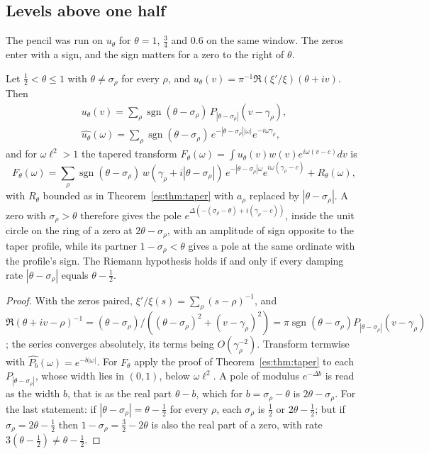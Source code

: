 \subsection{Levels above one half}

The pencil was run on $u_\theta$ for $\theta=1$, $\tfrac34$ and $0.6$ on the same window. The zeros enter with a sign, and the sign matters for a zero to the right of $\theta$.

\begin{proposition}\label{es:prop:level}
Let $\tfrac12<\theta\le1$ with $\theta\ne\sigma_\rho$ for every $\rho$, and $u_\theta(v)=\pi^{-1}\Re(\xi'/\xi)(\theta+iv)$. Then
\[
\begin{gathered}u_\theta(v)=\sum_\rho\operatorname{sgn}(\theta-\sigma_\rho)\,P_{|\theta-\sigma_\rho|}(v-\gamma_\rho),\\ \widehat{u_\theta}(\omega)=\sum_\rho\operatorname{sgn}(\theta-\sigma_\rho)\,e^{-|\theta-\sigma_\rho||\omega|}e^{-i\omega\gamma_\rho},\end{gathered}
\]
and for $\omega\ell^2>1$ the tapered transform $F_\theta(\omega)=\int u_\theta(v)w(v)e^{i\omega(v-c)}dv$ is
\[
F_\theta(\omega)=\sum_\rho\operatorname{sgn}(\theta-\sigma_\rho)\,w(\gamma_\rho+i|\theta-\sigma_\rho|)\,e^{-|\theta-\sigma_\rho|\omega}e^{i\omega(\gamma_\rho-c)}+R_\theta(\omega),
\]
with $R_\theta$ bounded as in Theorem~\ref{es:thm:taper} with $a_\rho$ replaced by $|\theta-\sigma_\rho|$. A zero with $\sigma_\rho>\theta$ therefore gives the pole $e^{\Delta(-(\sigma_\rho-\theta)+i(\gamma_\rho-c))}$, inside the unit circle on the ring of a zero at $2\theta-\sigma_\rho$, with an amplitude of sign opposite to the taper profile, while its partner $1-\sigma_\rho<\theta$ gives a pole at the same ordinate with the profile's sign. The Riemann hypothesis holds if and only if every damping rate $|\theta-\sigma_\rho|$ equals $\theta-\tfrac12$.
\end{proposition}

\begin{proof}
With the zeros paired, $\xi'/\xi(s)=\sum_\rho(s-\rho)^{-1}$, and $\Re(\theta+iv-\rho)^{-1}=(\theta-\sigma_\rho)/((\theta-\sigma_\rho)^2+(v-\gamma_\rho)^2)=\pi\operatorname{sgn}(\theta-\sigma_\rho)P_{|\theta-\sigma_\rho|}(v-\gamma_\rho)$; the series converges absolutely, its terms being $O(\gamma_\rho^{-2})$. Transform termwise with $\widehat{P_b}(\omega)=e^{-b|\omega|}$. For $F_\theta$ apply the proof of Theorem~\ref{es:thm:taper} to each $P_{|\theta-\sigma_\rho|}$, whose width lies in $(0,1)$, below $\omega\ell^2$. A pole of modulus $e^{-\Delta b}$ is read as the width $b$, that is as the real part $\theta-b$, which for $b=\sigma_\rho-\theta$ is $2\theta-\sigma_\rho$. For the last statement: if $|\theta-\sigma_\rho|=\theta-\tfrac12$ for every $\rho$, each $\sigma_\rho$ is $\tfrac12$ or $2\theta-\tfrac12$; but if $\sigma_\rho=2\theta-\tfrac12$ then $1-\sigma_\rho=\tfrac32-2\theta$ is also the real part of a zero, with rate $3(\theta-\tfrac12)\ne\theta-\tfrac12$.
\end{proof}


